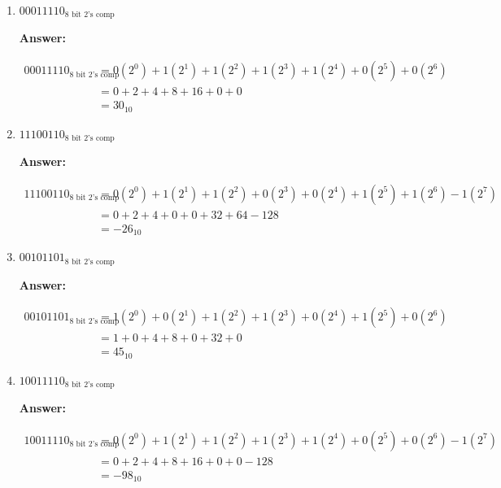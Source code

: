 \documentclass[12pt]{extreport}
\newcommand{\answer}[0]{\medskip \textbf{Answer:} \medskip}
\begin{document}
\begin{enumerate}
    
    \item \( 00011110_{\text{8 bit 2's comp}} \)
    
        \answer

        \begin{align*}
            00011110_{\text{8 bit 2's comp}} &= 0(2^0) + 1(2^1) + 1(2^2) + 1(2^3) + 1(2^4) + 0(2^5) + 0(2^6) \\
                                             &= 0 + 2 + 4 + 8 + 16 + 0 + 0 \\
                                             &= 30_{10}
        \end{align*}

    \item \( 11100110_{\text{8 bit 2's comp}} \)
    
        \answer

        \begin{align*}
            11100110_{\text{8 bit 2's comp}} &= 0(2^0) + 1(2^1) + 1(2^2) + 0(2^3) + 0(2^4) + 1(2^5) + 1(2^6) - 1(2^7)\\
                                             &= 0 + 2 + 4 + 0 + 0 + 32 + 64 - 128 \\
                                             &= -26_{10}
        \end{align*}

    \item \( 00101101_{\text{8 bit 2's comp}} \)
    
        \answer

        \begin{align*}
            00101101_{\text{8 bit 2's comp}} &= 1(2^0) + 0(2^1) + 1(2^2) + 1(2^3) + 0(2^4) + 1(2^5) + 0(2^6) \\
                                             &= 1 + 0 + 4 + 8 + 0 + 32 + 0 \\
                                             &= 45_{10}
        \end{align*}

    \item \( 10011110_{\text{8 bit 2's comp}} \)
    
        \answer

        \begin{align*}
            10011110_{\text{8 bit 2's comp}} &= 0(2^0) + 1(2^1) + 1(2^2) + 1(2^3) + 1(2^4) + 0(2^5) + 0(2^6) - 1(2^7)\\
                                             &= 0 + 2 + 4 + 8 + 16 + 0 + 0 - 128 \\
                                             &= -98_{10}            
        \end{align*}
    
\end{enumerate}
\newpage
\end{document}
